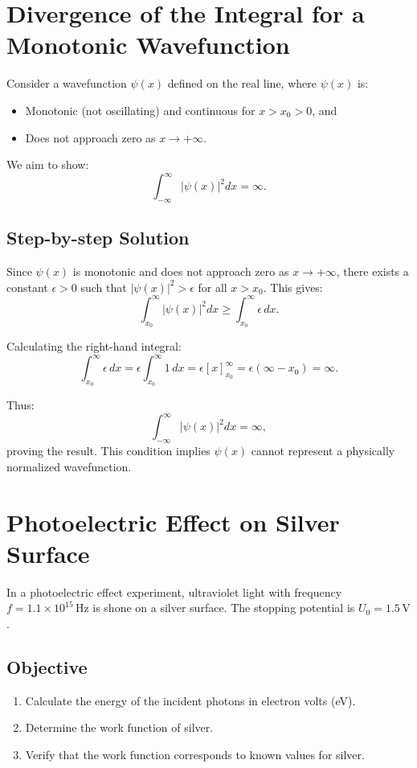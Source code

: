 \documentclass[a4paper,12pt]{article}
\begin{document}
\begin{multicols}{2}
\section*{Divergence of the Integral for a Monotonic Wavefunction}
Consider a wavefunction $\psi(x)$ defined on the real line, where $\psi(x)$ is:
\begin{itemize}
    \item Monotonic (not oscillating) and continuous for $x > x_0 > 0$, and
    \item Does not approach zero as $x \to +\infty$.
\end{itemize}

We aim to show:
\[
\int_{-\infty}^\infty |\psi(x)|^2 dx = \infty.
\]

\subsection*{Step-by-step Solution}
Since $\psi(x)$ is monotonic and does not approach zero as $x \to +\infty$, there exists a constant $\epsilon > 0$ such that $|\psi(x)|^2 > \epsilon$ for all $x > x_0$. This gives:
\[
\int_{x_0}^\infty |\psi(x)|^2 dx \geq \int_{x_0}^\infty \epsilon \, dx.
\]

Calculating the right-hand integral:
\[
\int_{x_0}^\infty \epsilon \, dx = \epsilon \int_{x_0}^\infty 1 \, dx = \epsilon \left[ x \right]_{x_0}^\infty = \epsilon (\infty - x_0) = \infty.
\]

Thus:
\[
\int_{-\infty}^\infty |\psi(x)|^2 dx = \infty,
\]
proving the result. This condition implies $\psi(x)$ cannot represent a physically normalized wavefunction.

\section*{Photoelectric Effect on Silver Surface}
In a photoelectric effect experiment, ultraviolet light with frequency $f = 1.1 \times 10^{15} \, \mathrm{Hz}$ is shone on a silver surface. The stopping potential is $U_0 = 1.5 \, \mathrm{V}$.

\subsection*{Objective}
\begin{enumerate}
    \item Calculate the energy of the incident photons in electron volts (eV).
    \item Determine the work function of silver.
    \item Verify that the work function corresponds to known values for silver.
\end{enumerate}


\end{multicols}
\end{document}
